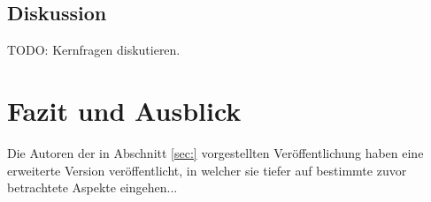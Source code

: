\documentclass[12pt, a4paper]{article}
\begin{document}
\subsection{Diskussion}

TODO: Kernfragen diskutieren.

\pagebreak

\section{Fazit und Ausblick}

Die Autoren der in Abschnitt \ref{sec:} vorgestellten Veröffentlichung haben eine erweiterte Version veröffentlicht,
in welcher sie tiefer auf bestimmte zuvor betrachtete Aspekte eingehen...

\vfill
\pagebreak


%

\end{document}
